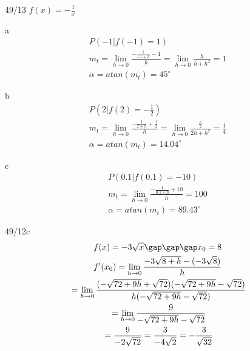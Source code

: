 \begin{exercise}{49/13}
  $f(x) = -\frac{1}{x}$
  \item [a]
  \begin{gather*}
    P(-1|f(-1) = 1) \\
    m_t = \lim\limits_{h \to 0} \frac{-\frac{1}{-1 + h} - 1}{h} = \lim\limits_{h \to 0} \frac{h}{h + h^2} = 1 \\
    \alpha = atan(m_t) = 45^\circ
  \end{gather*}
  \item [b]
  \begin{gather*}
    P(2|f(2) = -\frac{1}{2}) \\
    m_t = \lim\limits_{h \to 0} \frac{-\frac{1}{2 + h} + \frac{1}{2}}{h} = \lim\limits_{h \to 0} \frac{\frac{h}{2}}{2h + h^2} = \frac{1}{4} \\
    \alpha = atan(m_t) = 14.04^\circ
  \end{gather*}
  \item [c]
  \begin{gather*}
    P(0.1|f(0.1) = -10) \\
    m_t = \lim\limits_{h \to 0} \frac{-\frac{1}{0.1 + h} + 10}{h} = 100 \\
    \alpha = atan(m_t) = 89.43^\circ
  \end{gather*}
\end{exercise}
\begin{exercise}{49/12c}
  \begin{gather*}
    f(x) = -3\sqrt{x}\gap\gap\gap x_0 = 8 \\
    f'(x_0) = \lim\limits_{h \to 0} \frac{-3\sqrt{8 + h} - (-3\sqrt{8})}{h} \\
    \;= \lim\limits_{h \to 0} \frac{(-\sqrt{72 + 9h} + \sqrt{72})(-\sqrt{72 + 9h} - \sqrt{72})}{h(-\sqrt{72 + 9h} - \sqrt{72})} \\
    \;= \lim\limits_{h \to 0} \frac{9}{-\sqrt{72 + 9h} - \sqrt{72}} \\
    \;= \frac{9}{-2\sqrt{72}} = \frac{3}{-4\sqrt{2}} = -\frac{3}{\sqrt{32}}
  \end{gather*}
\end{exercise}

